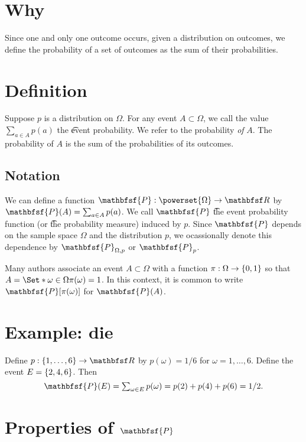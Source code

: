 

\section*{Why}

Since one and only one outcome occurs, given a distribution on outcomes, we define the probability of a set of outcomes as the sum of their probabilities.

\section*{Definition}

Suppose $p$ is a distribution on $\Omega $.
For any event $A \subset \Omega $, we call the value $\sum_{a \in A} p(a)$ the \t{event probability}.
We refer to the probability \textit{of} $A$.
The probability of $A$ is the sum of the probabilities of its outcomes.

\subsection*{Notation}

We can define a function $\mathbfsf{P} : \powerset{\Omega } \to \R $ by $\mathbfsf{P} (A) = \sum_{a \in A} p(a)$.
We call $\mathbfsf{P} $ \t{the event probability function} (or \t{the probability measure}) induced by $p$.
Since $\mathbfsf{P} $ depends on the sample space $\Omega $ and the distribution $p$, we ocassionally denote this dependence by $\mathbfsf{P} _{\Omega , p}$ or $\mathbfsf{P} _p$.

Many authors associate an event $A \subset \Omega $ with a function $\pi : \Omega  \to \{0, 1\}$ so that $A = \Set*{\omega  \in \Omega }{\pi (\omega ) = 1}$.
In this context, it is common to write $\mathbfsf{P} [\pi (\omega )]$ for $\mathbfsf{P} (A)$.

\section*{Example: die}

Define $p: \set{1, \dots , 6} \to \R $ by $p(\omega ) = 1/6$ for $\omega  = 1, \dots , 6$.
Define the event $E = \{2, 4, 6\}$.
Then
    \[
\textstyle
\mathbfsf{P} (E) = \sum_{\omega  \in E} p(\omega ) = p(2) + p(4) + p(6) = 1/2.
    \]

\section*{Properties of $\mathbfsf{P} $}

